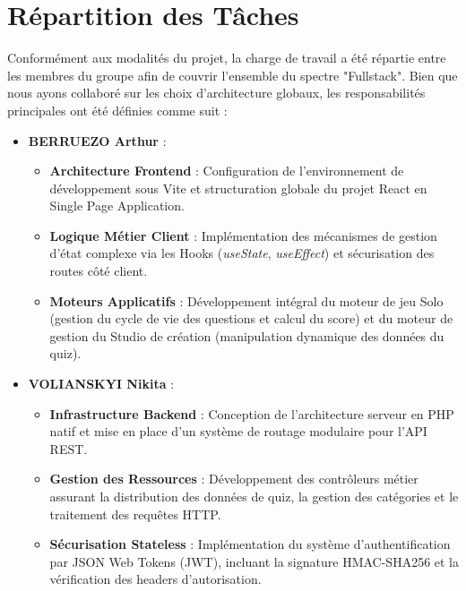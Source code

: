 \documentclass[12pt,a4paper]{article}
\begin{document}
\section{Répartition des Tâches}

Conformément aux modalités du projet, la charge de travail a été répartie entre les membres du groupe afin de couvrir l'ensemble du spectre "Fullstack". Bien que nous ayons collaboré sur les choix d'architecture globaux, les responsabilités principales ont été définies comme suit :

\begin{itemize}
    \item \textbf{BERRUEZO Arthur} : 
    \begin{itemize}
        \item \textbf{Architecture Frontend} : Configuration de l'environnement de développement sous Vite et structuration globale du projet React en Single Page Application.
        \item \textbf{Logique Métier Client} : Implémentation des mécanismes de gestion d'état complexe via les Hooks (\textit{useState}, \textit{useEffect}) et sécurisation des routes côté client.
        \item \textbf{Moteurs Applicatifs} : Développement intégral du moteur de jeu Solo (gestion du cycle de vie des questions et calcul du score) et du moteur de gestion du Studio de création (manipulation dynamique des données du quiz).
    \end{itemize}
    
    \item \textbf{VOLIANSKYI Nikita} : 
    \begin{itemize}
        \item \textbf{Infrastructure Backend} : Conception de l'architecture serveur en PHP natif et mise en place d'un système de routage modulaire pour l'API REST.
        \item \textbf{Gestion des Ressources} : Développement des contrôleurs métier assurant la distribution des données de quiz, la gestion des catégories et le traitement des requêtes HTTP.
        \item \textbf{Sécurisation Stateless} : Implémentation du système d'authentification par JSON Web Tokens (JWT), incluant la signature HMAC-SHA256 et la vérification des headers d'autorisation.
    \end{itemize}
    

\end{itemize}
\end{document}
